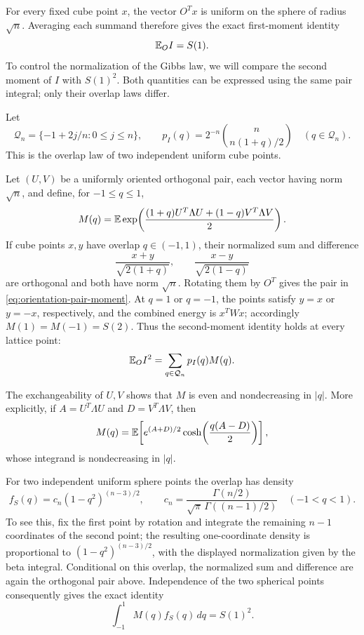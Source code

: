 For every fixed cube point $x$, the vector $O^Tx$ is uniform on the
sphere of radius $\sqrt n$. Averaging each summand therefore gives the
exact first-moment identity
\[
 \mathbb E_O I=S(1).
\]
To control the normalization of the Gibbs law, we will compare the
second moment of $I$ with $S(1)^2$. Both quantities can be expressed
using the same pair integral; only their overlap laws differ.

Let
\[
 \mathcal Q_n=\{-1+2j/n:0\le j\le n\},
 \qquad
 p_I(q)=2^{-n}\binom{n}{n(1+q)/2}\quad(q\in\mathcal Q_n).
\]
This is the overlap law of two independent uniform cube points.

Let $(U,V)$ be a uniformly oriented orthogonal pair, each vector having norm
$\sqrt n$, and define, for $-1\le q\le1$,
\begin{equation}
 M(q)=\mathbb E\exp\!\left(
       \frac{(1+q)U^T\Lambda U+(1-q)V^T\Lambda V}{2}\right).
 \label{eq:orientation-pair-moment}
\end{equation}
If cube points $x,y$ have overlap $q\in(-1,1)$, their normalized sum and
difference
\[
 \frac{x+y}{\sqrt{2(1+q)}},
 \qquad
 \frac{x-y}{\sqrt{2(1-q)}}
\]
are orthogonal and both have norm $\sqrt n$.  Rotating them by $O^T$ gives
the pair in \eqref{eq:orientation-pair-moment}.  At $q=1$ or $q=-1$, the
points satisfy $y=x$ or $y=-x$, respectively, and the combined energy is
$x^T W x$; accordingly $M(1)=M(-1)=S(2)$.  Thus the second-moment identity
holds at every lattice point:
\begin{equation}
 \mathbb E_O I^2=\sum_{q\in\mathcal Q_n}p_I(q)M(q).
 \label{eq:orientation-second-moment}
\end{equation}

The exchangeability of $U,V$ shows that $M$ is even and nondecreasing in
$|q|$.  More explicitly, if $A=U^T\Lambda U$ and $D=V^T\Lambda V$, then
\[
 M(q)=\mathbb E\!\left[
 e^{(A+D)/2}\cosh\!\left(\frac{q(A-D)}2\right)\right],
\]
whose integrand is nondecreasing in $|q|$.

For two independent uniform sphere points the overlap has density
\[
 f_S(q)=c_n(1-q^2)^{(n-3)/2},
 \qquad
 c_n=\frac{\Gamma(n/2)}{\sqrt\pi\,\Gamma((n-1)/2)}
 \quad(-1<q<1).
\]
To see this, fix the first point by rotation and integrate the remaining
$n-1$ coordinates of the second point; the resulting one-coordinate
density is proportional to $(1-q^2)^{(n-3)/2}$, with the displayed
normalization given by the beta integral.  Conditional on this overlap,
the normalized sum and difference are again the orthogonal pair above.
Independence of the two spherical points consequently gives the exact identity
\begin{equation}
 \int_{-1}^1 M(q)f_S(q)\,dq=S(1)^2.
 \label{eq:orientation-spherical-second-moment}
\end{equation}

